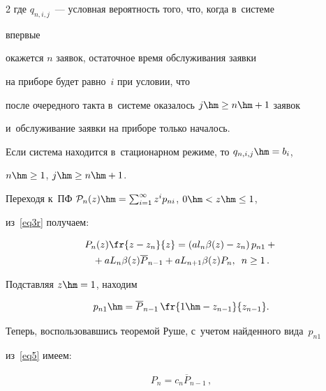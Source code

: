 \begin{multicols}{2}
где $q_{n,i,j}$~--- условная вероятность того, что, когда в~системе 


впервые


окажется $n$ заявок, остаточное время обслуживания заявки


на приборе будет равно~$i$ при условии, что


после очередного такта в~сис\-те\-ме оказалось $j \hm\ge n\hm+1$ заявок


и~обслуживание заявки на приборе только началось.


Если система находится в~стационарном режиме, то $q_{n,i,j}\hm=b_i$,


$n\hm\ge 1$, $j \hm\ge n\hm+1$.





Переходя к~ПФ $\mathcal{P}_n(z)\hm=\sum\nolimits_{i=1}^\infty z^i 


p_{ni}$, $0 \hm< z \hm\le 1$,


из~\eqref{eq3r} получаем:


\begin{multline}


\label{eq5}


P_n(z) \fr{z - z_n }{z}=


\left(a l_n \beta(z) - z_n \right) p_{n1}+{}\\


{}+a L_n \beta(z) {\overline P}_{n-1}


+a L_{n+1} \beta(z) P_n, \enskip n \ge 1\,.


\end{multline}





\noindent  


Подставляя $z\hm=1$, находим 


$${p_{n1}\hm={\overline P}_{n-1}\,\fr{1\hm-z_{n-1}}{z_{n-1}}}.


$$


Теперь, воспользовавшись теоремой Руше, с~учетом найденного вида~$p_{n1}$ 


из~\eqref{eq5} имеем:




\begin{multline*}




P_n


=c_n {\overline P}_{n-1}\,,\\



\end{multline*}
\end{multicols}

